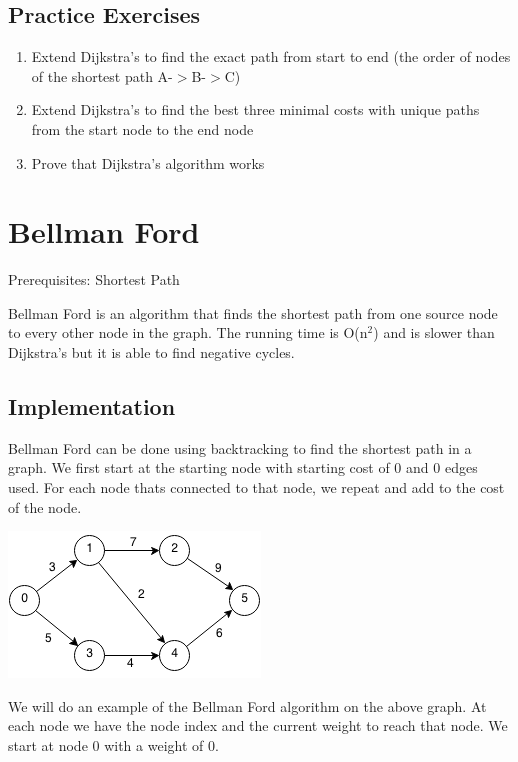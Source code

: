 \documentclass[11pt,oneside]{book}
\makeatletter
\def\maxwidth#1{\ifdim\Gin@nat@width>#1 #1\else\Gin@nat@width\fi}
\makeatother
\begin{document}
\subsection{Practice Exercises}

\begin{enumerate}
\item Extend Dijkstra's to find the exact path from start to end (the order of nodes of the shortest path A-$>$B-$>$C)
\item Extend Dijkstra's to find the best three minimal costs with unique paths from the start node to the end node
\item Prove that Dijkstra's algorithm works
\end{enumerate}

        \section{ Bellman Ford }
        

Prerequisites:  Shortest Path

Bellman Ford is an algorithm that finds the shortest path from one source node to every other node in the graph. The running time is O(n$^{2}$) and is slower than Dijkstra's but it is able to find negative cycles.

\subsection{Implementation}

Bellman Ford can be done using backtracking to find the shortest path in a graph. We first start at the starting node with starting cost of 0 and 0 edges used. For each node thats connected to that node, we repeat and add to the cost of the node.

\includegraphics[width=\maxwidth{\textwidth}]{bellmanford.png}

We will do an example of the Bellman Ford algorithm on the above graph. At each node we have the node index and the current weight to reach that node. We start at node 0 with a weight of 0.
\end{document}
